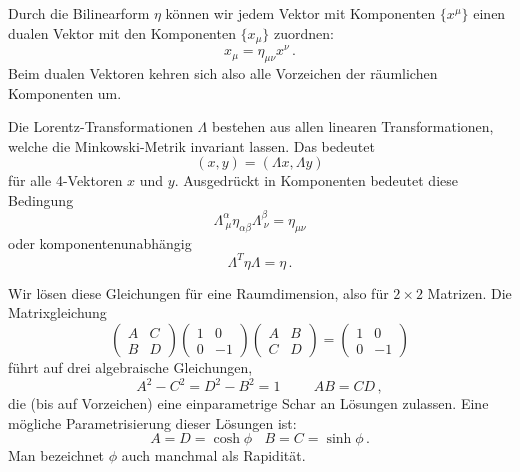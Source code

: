 Durch die Bilinearform $\eta$ k\"onnen wir
jedem Vektor mit Komponenten $\{x^\mu\}$ einen dualen Vektor
mit den Komponenten $\{x_\mu\}$ zuordnen:
\begin{equation}
            x_\mu = \eta_{\mu \nu} x^\nu  \, .
\end{equation}
Beim dualen Vektoren kehren sich also
alle Vorzeichen der r\"aumlichen Komponenten
um.

Die Lorentz-Transformationen $\Lambda$
bestehen aus allen linearen Transformationen, welche die
Minkow\-ski-Metrik invariant lassen.
Das bedeutet
\begin{equation}
      (x, y) = (\Lambda x, \Lambda y) 
\end{equation}
f\"ur alle 4-Vektoren $x$ und $y$. 
Ausgedr\"uckt in Komponenten bedeutet
diese Bedingung
\begin{equation}
    \Lambda^\alpha_{~ \mu} \eta_{\alpha \beta} 
    \Lambda^\beta_{~ \nu}  = \eta_{\mu \nu}      
\end{equation}
oder komponentenunabh\"angig
\begin{equation}
    \Lambda^T \eta \Lambda = \eta  \, .      
\end{equation}

Wir l\"osen diese Gleichungen f\"ur
eine Raumdimension, also f\"ur $2\times 2$
Matrizen. Die Matrixgleichung
\begin{equation}
 \left( \begin{array}{cc} A & C \\ B & D
 \end{array} \right)
 \left( \begin{array}{cc} 1 & 0 \\ 0 & -1
 \end{array} \right)
 \left( \begin{array}{cc} A & B \\ C & D
 \end{array} \right)
 =
  \left( \begin{array}{cc} 1 & 0 \\ 0 & -1
 \end{array} \right)
\end{equation} 
f\"uhrt auf drei algebraische Gleichungen,
\begin{equation}
    A^2-C^2=D^2 - B^2 = 1 \hspace{1cm} AB=CD  \, , 
\end{equation}
die (bis auf Vorzeichen) eine einparametrige 
Schar an L\"osungen zulassen. Eine m\"ogliche
Parametrisierung dieser L\"osungen ist:
\begin{equation}
      A = D = \cosh \phi ~~~~  B = C = \sinh \phi \, .
\end{equation}
Man bezeichnet $\phi$ auch manchmal als
Rapidit\"at. 

